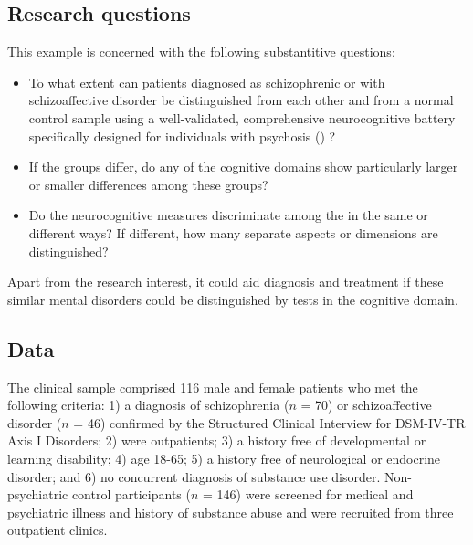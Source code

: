 \documentclass[
  letterpaper,
  10pt,
  krantz2]{krantz}
\begin{document}
\subsection{Research questions}\label{research-questions}

This example is concerned with the following substantitive questions:

\begin{itemize}
\item
  To what extent can patients diagnosed as schizophrenic or with
  schizoaffective disorder be distinguished from each other and from a
  normal control sample using a well-validated, comprehensive
  neurocognitive battery specifically designed for individuals with
  psychosis ()
  ?
\item
  If the groups differ, do any of the cognitive domains show
  particularly larger or smaller differences among these groups?
\item
  Do the neurocognitive measures discriminate among the in the same or
  different ways? If different, how many separate aspects or dimensions
  are distinguished?
\end{itemize}

Apart from the research interest, it could aid diagnosis and treatment
if these similar mental disorders could be distinguished by tests in the
cognitive domain.

\subsection{Data}\label{data}

The clinical sample comprised 116 male and female patients who met the
following criteria: 1) a diagnosis of schizophrenia (\(n\) = 70) or
schizoaffective disorder (\(n\) = 46) confirmed by the Structured
Clinical Interview for DSM-IV-TR Axis I Disorders; 2) were outpatients;
3) a history free of developmental or learning disability; 4) age 18-65;
5) a history free of neurological or endocrine disorder; and 6) no
concurrent diagnosis of substance use disorder. Non-psychiatric control
participants (\(n\) = 146) were screened for medical and psychiatric
illness and history of substance abuse and were recruited from three
outpatient clinics.
\end{document}
